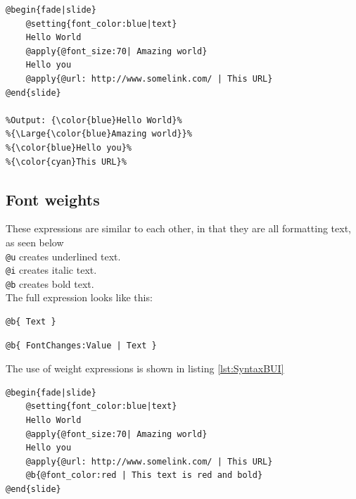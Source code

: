 {\begin{lstlisting}[frame=single, caption=Hello World with an URL, label=lst:SyntaxURL]
@begin{fade|slide}
    @setting{font_color:blue|text}
    Hello World
    @apply{@font_size:70| Amazing world}
    Hello you
    @apply{@url: http://www.somelink.com/ | This URL}
@end{slide}

%Output: {\color{blue}Hello World}%
%{\Large{\color{blue}Amazing world}}%
%{\color{blue}Hello you}%
%{\color{cyan}This URL}%
\end{lstlisting}

\subsection{Font weights}
These expressions are similar to each other, in that they are all formatting text, as seen below \\

\texttt{@u} creates underlined text. \\
\texttt{@i} creates italic text. \\
\texttt{@b} creates bold text. \\
The full expression looks like this:
\begin{lstlisting}[frame=single]
@b{ Text }
\end{lstlisting}


\begin{lstlisting}[frame=single]
@b{ FontChanges:Value | Text }
\end{lstlisting}

The use of weight expressions is shown in listing \ref{lst:SyntaxBUI}
\begin{lstlisting}[frame=single, caption=Hello World with font weight, label=lst:SyntaxBUI]
@begin{fade|slide}
    @setting{font_color:blue|text}
    Hello World
    @apply{@font_size:70| Amazing world}
    Hello you
    @apply{@url: http://www.somelink.com/ | This URL}
    @b{@font_color:red | This text is red and bold}
@end{slide}


\end{lstlisting}}
